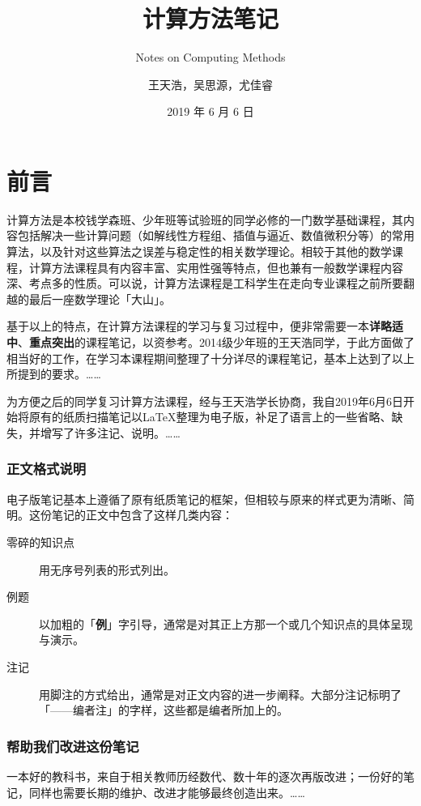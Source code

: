 \documentclass[opensource,b5paper,sourcefont]{qyxf-book}
\title{计算方法笔记}
\subtitle{Notes on Computing Methods}
\author{王天浩，吴思源，尤佳睿}
\date{2019 年 6 月 6 日}
\begin{document}
\maketitle

\frontmatter
\chapter*{前言}
计算方法是本校钱学森班、少年班等试验班的同学必修的一门数学基础课程，其内容包括解决一些计算问题（如解线性方程组、插值与逼近、数值微积分等）的常用算法，以及针对这些算法之误差与稳定性的相关数学理论。相较于其他的数学课程，计算方法课程具有内容丰富、实用性强等特点，但也兼有一般数学课程内容深、考点多的性质。可以说，计算方法课程是工科学生在走向专业课程之前所要翻越的最后一座数学理论「大山」。

基于以上的特点，在计算方法课程的学习与复习过程中，便非常需要一本\textbf{详略适中}、\textbf{重点突出}的课程笔记，以资参考。2014级少年班的王天浩同学，于此方面做了相当好的工作，在学习本课程期间整理了十分详尽的课程笔记，基本上达到了以上所提到的要求。……

为方便之后的同学复习计算方法课程，经与王天浩学长协商，我自2019年6月6日开始将原有的纸质扫描笔记以\LaTeX 整理为电子版，补足了语言上的一些省略、缺失，并增写了许多注记、说明。……

\subsection*{正文格式说明}
电子版笔记基本上遵循了原有纸质笔记的框架，但相较与原来的样式更为清晰、简明。这份笔记的正文中包含了这样几类内容：
\begin{description}
    \item[零碎的知识点] 用无序号列表的形式列出。
    \item[例题] 以加粗的「\textbf{例}」字引导，通常是对其正上方那一个或几个知识点的具体呈现与演示。
    \item[注记] 用脚注的方式给出，通常是对正文内容的进一步阐释。大部分注记标明了「——编者注」的字样，这些都是编者所加上的。
\end{description}

\subsection*{帮助我们改进这份笔记}
一本好的教科书，来自于相关教师历经数代、数十年的逐次再版改进；一份好的笔记，同样也需要长期的维护、改进才能够最终创造出来。……
\end{document}
